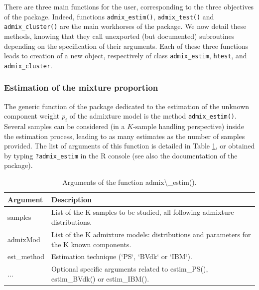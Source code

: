 There are three main functions for the user, corresponding to the three objectives of the package. Indeed, functions \texttt{admix\_estim()}, \texttt{admix\_test()} and \texttt{admix\_cluster()} are the main workhorses of the  package. We now detail these methods, knowing that they call unexported (but documented) subroutines depending on the specification of their arguments.
Each of these three functions leads to creation of a new object, respectively of class \texttt{admix\_estim}, \texttt{htest}, and \texttt{admix\_cluster}.

\subsubsection{Estimation of the mixture proportion}\label{estimation-of-the-mixture-proportion}

The generic function of the package dedicated to the estimation of the unknown component weight \(p_i\) of the admixture model is the method \texttt{admix\_estim()}. Several samples can be considered (in a \(K\)-sample handling perspective) inside the estimation process, leading to as many estimates as the number of samples provided. The list of arguments of this function is detailed in Table \ref{tab:admixEstimArgs-latex}, or obtained by typing \texttt{?admix\_estim} in the R console (see also the documentation of the package).

\begin{table}[!h]
\centering
\caption{\label{tab:admixEstimArgs-latex}Arguments of the function admix\textbackslash{}\_estim().}
\centering
\fontsize{8}{10}\selectfont
\begin{tabular}[t]{ll}
\toprule
Argument & Description\\
\midrule
samples & List of the K samples to be studied, all following admixture distributions.\\
admixMod & List of the K admixture models: distributions and parameters for the K known components.\\
est\_method & Estimation technique (`PS`, `BVdk` or `IBM`).\\
... & Optional specific arguments related to estim\_PS(), estim\_BVdk() or estim\_IBM().\\
\bottomrule
\end{tabular}
\end{table}

